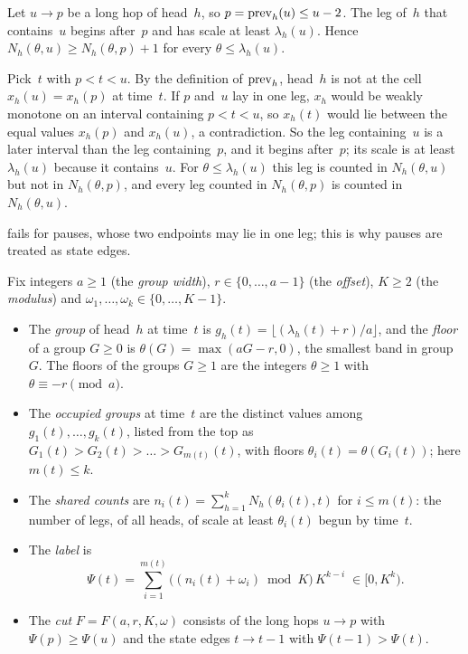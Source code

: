 \begin{lemma}\label{lem:legs}
\notformalized
Let $u\to p$ be a long hop of head~$h$, so $p=\mathrm{prev}_h(u)\le u-2$. The leg of~$h$ that contains~$u$ begins after~$p$
and has scale at least $\lambda_h(u)$. Hence $N_h(\theta,u)\ge N_h(\theta,p)+1$ for every $\theta\le\lambda_h(u)$.
\end{lemma}

\begin{informalproof}
Pick~$t$ with $p<t<u$. By the definition of $\mathrm{prev}_h$, head~$h$ is not at the cell $x_h(u)=x_h(p)$ at time~$t$. If
$p$ and~$u$ lay in one leg, $x_h$ would be weakly monotone on an interval containing $p<t<u$, so $x_h(t)$ would lie
between the equal values $x_h(p)$ and $x_h(u)$, a contradiction. So the leg containing~$u$ is a later interval than
the leg containing~$p$, and it begins after~$p$; its scale is at least $\lambda_h(u)$ because it contains~$u$. For
$\theta\le\lambda_h(u)$ this leg is counted in $N_h(\theta,u)$ but not in $N_h(\theta,p)$, and every leg counted in
$N_h(\theta,p)$ is counted in $N_h(\theta,u)$.
\end{informalproof}

 fails for pauses, whose two endpoints may lie in one leg; this is why pauses are treated as state edges.

\begin{definition}\label{def:dec-label}
Fix integers $a\ge1$ (the \emph{group width}), $r\in\{0,\dots,a-1\}$ (the \emph{offset}), $K\ge2$ (the
\emph{modulus}) and $\omega_1,\dots,\omega_k\in\{0,\dots,K-1\}$.
\begin{itemize}[leftmargin=2em]
\item The \emph{group} of head~$h$ at time~$t$ is $g_h(t)=\lfloor(\lambda_h(t)+r)/a\rfloor$, and the \emph{floor} of
a group $G\ge0$ is $\theta(G)=\max(aG-r,0)$, the smallest band in group~$G$. The floors of the groups $G\ge1$ are the
integers $\theta\ge1$ with $\theta\equiv-r\pmod a$.
\item The \emph{occupied groups} at time~$t$ are the distinct values among $g_1(t),\dots,g_k(t)$, listed from the top
as $G_1(t)>G_2(t)>\dots>G_{m(t)}(t)$, with floors $\theta_i(t)=\theta(G_i(t))$; here $m(t)\le k$.
\item The \emph{shared counts} are $n_i(t)=\sum_{h=1}^kN_h(\theta_i(t),t)$ for $i\le m(t)$: the number of
legs, of all heads, of scale at least $\theta_i(t)$ begun by time~$t$.
\item The \emph{label} is
\[
  \Psi(t)=\sum_{i=1}^{m(t)}\bigl((n_i(t)+\omega_i)\bmod K\bigr)\,K^{k-i}\;\in[0,K^k).
\]
\item The \emph{cut} $F=F(a,r,K,\omega)$ consists of the long hops $u\to p$ with $\Psi(p)\ge\Psi(u)$ and the state
edges $t\to t-1$ with $\Psi(t-1)>\Psi(t)$.
\end{itemize}
\end{definition}

